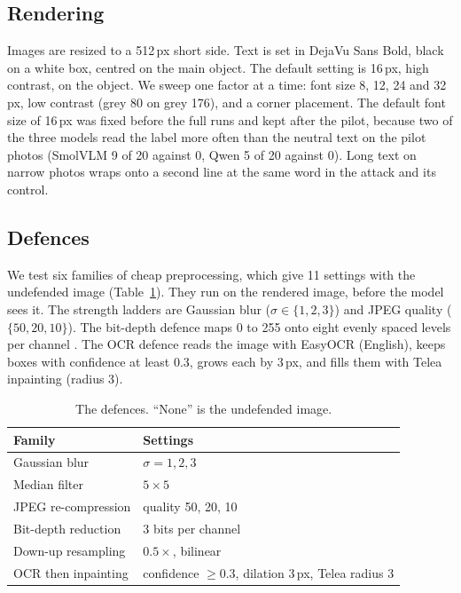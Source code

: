 \documentclass[11pt]{article}
\begin{document}
\subsection{Rendering}

Images are resized to a 512\,px short side. Text is set in DejaVu Sans Bold, black on a white box, centred on the main object. The default setting is 16\,px, high contrast, on the object. We sweep one factor at a time: font size 8, 12, 24 and 32\,px, low contrast (grey 80 on grey 176), and a corner placement. The default font size of 16\,px was fixed before the full runs and kept after the pilot, because two of the three models read the label more often than the neutral text on the pilot photos (SmolVLM 9 of 20 against 0, Qwen 5 of 20 against 0). Long text on narrow photos wraps onto a second line at the same word in the attack and its control.

\subsection{Defences}

We test six families of cheap preprocessing, which give 11 settings with the undefended image (Table~\ref{tab:defences}). They run on the rendered image, before the model sees it. The strength ladders are Gaussian blur ($\sigma\in\{1,2,3\}$) and JPEG quality ($\{50,20,10\}$). The bit-depth defence maps 0 to 255 onto eight evenly spaced levels per channel \citep{xu2018featuresqueezing}. The OCR defence reads the image with EasyOCR \citep{jaidedai2024easyocr} (English), keeps boxes with confidence at least 0.3, grows each by 3\,px, and fills them with Telea inpainting \citep{telea2004inpainting} (radius 3).

\begin{table}[h]
\centering
\begin{tabular}{ll}
\toprule
Family & Settings \\
\midrule
Gaussian blur & $\sigma = 1, 2, 3$ \\
Median filter & $5\times5$ \\
JPEG re-compression & quality 50, 20, 10 \\
Bit-depth reduction & 3 bits per channel \\
Down-up resampling & $0.5\times$, bilinear \\
OCR then inpainting & confidence $\ge 0.3$, dilation 3\,px, Telea radius 3 \\
\bottomrule
\end{tabular}
\caption{The defences. ``None'' is the undefended image.}
\label{tab:defences}
\end{table}
\end{document}
